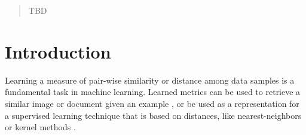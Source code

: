 \documentclass{article}
\begin{document}
 


\newcommand\todo[1]{\textbf{<ToDo:#1}!}
\newcommand\mat[1]{{#1}}
\renewcommand\vec[1]{\mathbf{#1}}
\newcommand{\T}{{}^\mathsf{T}}
\newcommand{\W}{\mat{W}}
\newcommand{\E}{\mat{E}}
\newcommand{\Hh}{\mat{H}}
\newcommand{\newW}{{\mat{W^*}}}
\newcommand{\eqdef}{\doteq}
\newcommand{\Rd}{\mathbb{R}^d}
\newcommand{\R}{\mathbb{R}}
\newcommand{\tL}{\tilde{L}(\W)}
\newcommand{\frob}[1]{{\|#1\|_F^2}} 
\newcommand{\ignore}[1]{}

\newcommand{\q}{{\vec{q}}}
\newcommand{\p}{{\vec{p}}}
\newcommand{\trip}{{t}}
\newcommand{\qt}{{\q_{\trip}}}
\newcommand{\pt}{{\p_{\trip}}}

\newcommand{\grd}{\frac{\partial \tL}{\W}}

\newtheorem{theorem}{Theorem}
\newtheorem{lemma}{Lemma}
\newtheorem{corollary}{Corollary}
\newtheorem{definition}{Definition}

\renewcommand{\eqref}[1]{Eq.~(\ref{#1})}
\newcommand{\figref}[1]{Fig.~\ref{#1}}
\newcommand{\secref}[1]{Sec.~\ref{#1}}
\newcommand{\tabref}[1]{Table~\ref{#1}}


\begin{abstract} 
TBD
\end{abstract} 

\section{Introduction}
Learning a measure of pair-wise similarity or distance among data samples is a fundamental task in machine learning. Learned metrics can be used to retrieve a similar image or document given an example \cite{}, or be used as a representation for a supervised learning technique that is based on distances, like nearest-neighbors or kernel methods \cite{}.
\end{document}
